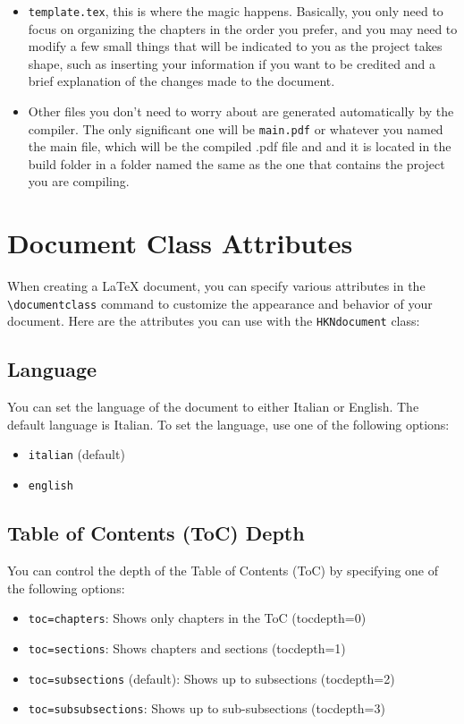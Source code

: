 \begin{itemize}
\begin{itemize}
    \end{itemize}
    \item \texttt{template.tex}, this is where the magic happens. Basically, you only need to focus on organizing the chapters in the order you prefer, and you may need to modify a few small things that will be indicated to you as the project takes shape, such as inserting your information if you want to be credited and a brief explanation of the changes made to the document.
    \item Other files you don't need to worry about are generated automatically by the compiler. The only significant one will be \texttt{main.pdf} or whatever you named the main file, which will be the compiled .pdf file and and it is located in the build folder in a folder named the same as the one that contains the project you are compiling.
\end{itemize}


\section{Document Class Attributes}

When creating a LaTeX document, you can specify various attributes in the \texttt{\textbackslash documentclass} command to customize the appearance and behavior of your document. Here are the attributes you can use with the \texttt{HKNdocument} class:

\subsection{Language}

You can set the language of the document to either Italian or English. The default language is Italian. To set the language, use one of the following options:
\begin{itemize}
  \item \texttt{italian} (default)
  \item \texttt{english}
\end{itemize}

\subsection{Table of Contents (ToC) Depth}

You can control the depth of the Table of Contents (ToC) by specifying one of the following options:
\begin{itemize}
  \item \texttt{toc=chapters}: Shows only chapters in the ToC (tocdepth=0)
  \item \texttt{toc=sections}: Shows chapters and sections (tocdepth=1)
  \item \texttt{toc=subsections} (default): Shows up to subsections (tocdepth=2)
  \item \texttt{toc=subsubsections}: Shows up to sub-subsections (tocdepth=3)
\end{itemize}

